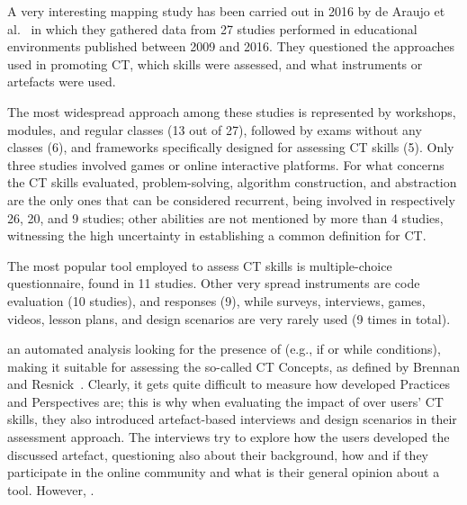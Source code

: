 A very interesting mapping study has been carried out in 2016 by de Araujo et al.~\cite{de2016systematic} in which they gathered data from 27 studies performed in educational environments published between 2009 and 2016. They questioned the approaches used in promoting \ac{CT}, which skills were assessed, and what instruments or artefacts were used.

The most widespread approach among these studies is represented by workshops, modules, and regular classes (13 out of 27), followed by exams without any classes (6), and frameworks specifically designed for assessing \ac{CT} skills (5). Only three studies involved games or online interactive platforms. For what concerns the \ac{CT} skills evaluated, problem-solving, algorithm construction, and abstraction are the only ones that can be considered recurrent, being involved in respectively 26, 20, and 9 studies; other abilities are not mentioned by more than 4 studies, witnessing the high uncertainty in establishing a common definition for \ac{CT}.

The most popular tool employed to assess \ac{CT} skills is multiple-choice questionnaire, found in 11 studies. Other very spread instruments are code evaluation (10 studies), and responses (9), while surveys, interviews, games, videos, lesson plans, and design scenarios are very rarely used (9 times in total).

 an automated analysis looking for the presence of  (e.g., if or while conditions), making it suitable for assessing the so-called \ac{CT} Concepts, as defined by Brennan and Resnick~\cite{Brennan:2012}. Clearly, it gets quite difficult to measure how developed Practices and Perspectives are; this is why when evaluating the impact of  over users' \ac{CT} skills, they also introduced artefact-based interviews and design scenarios in their assessment approach. The interviews try to explore how the users developed the discussed artefact, questioning also about their background, how and if they participate in the online community and what is their general opinion about a tool. However, .

